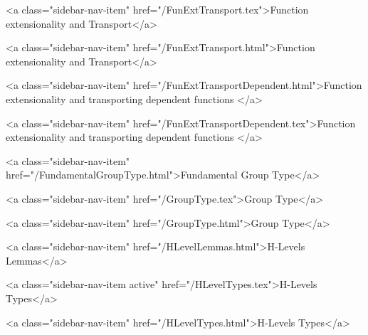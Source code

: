       
    
      
        
          <a class="sidebar-nav-item" href="/FunExtTransport.tex">Function extensionality and Transport</a>
        
      
    
      
        
          <a class="sidebar-nav-item" href="/FunExtTransport.html">Function extensionality and Transport</a>
        
      
    
      
        
          <a class="sidebar-nav-item" href="/FunExtTransportDependent.html">Function extensionality and transporting dependent functions </a>
        
      
    
      
        
          <a class="sidebar-nav-item" href="/FunExtTransportDependent.tex">Function extensionality and transporting dependent functions </a>
        
      
    
      
        
          <a class="sidebar-nav-item" href="/FundamentalGroupType.html">Fundamental Group Type</a>
        
      
    
      
        
          <a class="sidebar-nav-item" href="/GroupType.tex">Group Type</a>
        
      
    
      
        
          <a class="sidebar-nav-item" href="/GroupType.html">Group Type</a>
        
      
    
      
        
          <a class="sidebar-nav-item" href="/HLevelLemmas.html">H-Levels Lemmas</a>
        
      
    
      
        
          <a class="sidebar-nav-item active" href="/HLevelTypes.tex">H-Levels Types</a>
        
      
    
      
        
          <a class="sidebar-nav-item" href="/HLevelTypes.html">H-Levels Types</a>
        
      
    
